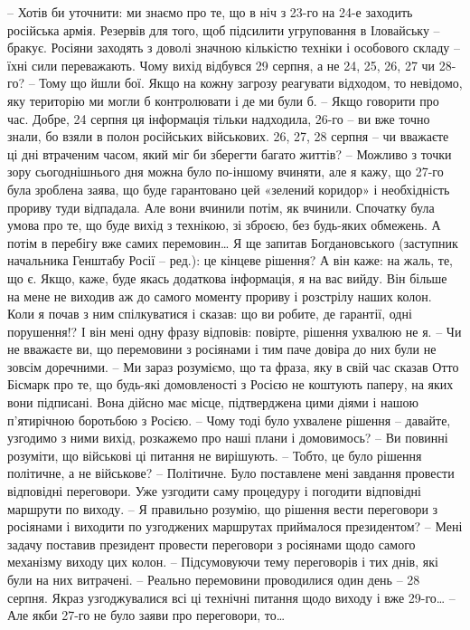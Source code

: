 – Хотів би уточнити: ми знаємо про те, що в ніч з 23-го на 24-е заходить російська армія. Резервів для того, щоб підсилити угруповання в Іловайську – бракує. Росіяни заходять з доволі значною кількістю техніки і особового складу – їхні сили переважають. Чому вихід відбувся 29 серпня, а не 24, 25, 26, 27 чи 28-го?
– Тому що йшли бої. Якщо на кожну загрозу реагувати відходом, то невідомо, яку територію ми могли б контролювати і де ми були б.
– Якщо говорити про час. Добре, 24 серпня ця інформація тільки надходила, 26-го – ви вже точно знали, бо взяли в полон російських військових. 26, 27, 28 серпня – чи вважаєте ці дні втраченим часом, який міг би зберегти багато життів?
– Можливо з точки зору сьогоднішнього дня можна було по-іншому вчиняти, але я кажу, що 27-го була зроблена заява, що буде гарантовано цей «зелений коридор» і необхідність прориву туди відпадала. Але вони вчинили потім, як вчинили. Спочатку була умова про те, що буде вихід з технікою, зі зброєю, без будь-яких обмежень. А потім в перебігу вже самих перемовин… Я ще запитав Богдановського (заступник начальника Генштабу Росії – ред.): це кінцеве рішення? А він каже: на жаль, те, що є. Якщо, каже, буде якась додаткова інформація, я на вас вийду. Він більше на мене не виходив аж до самого моменту прориву і розстрілу наших колон. Коли я почав з ним спілкуватися і сказав: що ви робите, де гарантії, одні порушення!? І він мені одну фразу відповів: повірте, рішення ухвалюю не я.
– Чи не вважаєте ви, що перемовини з росіянами і тим паче довіра до них були не зовсім доречними.
– Ми зараз розуміємо, що та фраза, яку в свій час сказав Отто Бісмарк про те, що будь-які домовленості з Росією не коштують паперу, на яких вони підписані. Вона дійсно має місце, підтверджена цими діями і нашою п’ятирічною боротьбою з Росією.
– Чому тоді було ухвалене рішення – давайте, узгодимо з ними вихід, розкажемо про наші плани і домовимось?
– Ви повинні розуміти, що військові ці питання не вирішують.
– Тобто, це було рішення політичне, а не військове?
– Політичне. Було поставлене мені завдання провести відповідні переговори. Уже узгодити саму процедуру і погодити відповідні маршрути по виходу.
– Я правильно розумію, що рішення вести переговори з росіянами і виходити по узгоджених маршрутах приймалося президентом?
– Мені задачу поставив президент провести переговори з росіянами щодо самого механізму виходу цих колон.
– Підсумовуючи тему переговорів і тих днів, які були на них витрачені.
– Реально перемовини проводилися один день – 28 серпня. Якраз узгоджувалися всі ці технічні питання щодо виходу і вже 29-го…
– Але якби 27-го не було заяви про переговори, то…
